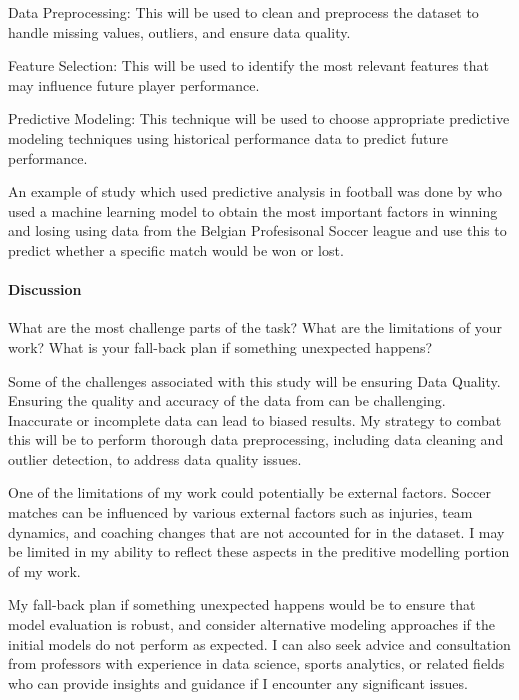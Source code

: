 \documentclass[12pt]{article}
\begin{document}
Data Preprocessing:
This will be used to clean and preprocess the dataset to handle missing values,
outliers, and ensure data quality.

Feature Selection:
This will be used to identify the most relevant features that may influence 
future player performance.

Predictive Modeling:
This technique will be used to choose appropriate predictive modeling techniques
using historical performance data to predict future performance. 

An example of study which used predictive analysis in football was done by 
\citet{geurkink2021machine} who used a machine 
learning model to obtain the most important factors in winning and losing using
data from the Belgian Profesisonal Soccer league and use this to predict whether
a specific match would be won or lost.

\paragraph{Discussion}
What are the most challenge parts of the task?
What are the limitations of your work? What is your fall-back plan if
something unexpected happens?

Some of the challenges associated with this study will be ensuring Data Quality.
Ensuring the quality and accuracy of the data from can be challenging. 
Inaccurate or incomplete data can lead to biased results. My strategy to combat
this will be to perform thorough data preprocessing, including data cleaning and
outlier detection, to address data quality issues.

One of the limitations of my work could potentially be external factors.
Soccer matches can be influenced by various external factors such as injuries,
team dynamics, and coaching changes that are not accounted for in the dataset.
I may be limited in my ability to reflect these aspects in the preditive 
modelling portion of my work.

My fall-back plan if something unexpected happens would be to ensure that model
evaluation is robust, and consider alternative modeling approaches if the 
initial models do not perform as expected. I can also seek advice and 
consultation from professors with experience in data science, sports analytics,
or related fields who can provide insights and guidance if I encounter any
significant issues.




\end{document}
